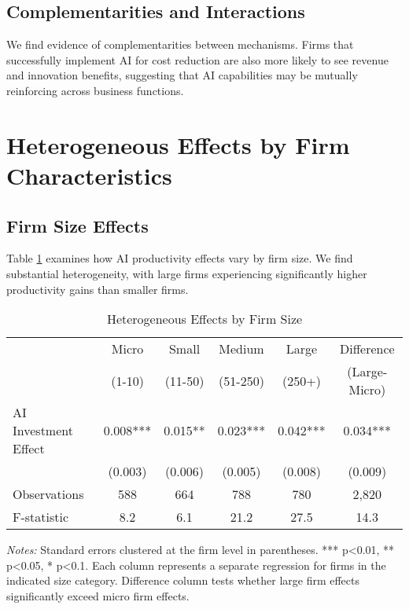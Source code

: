 \documentclass[12pt, a4paper]{article}
\begin{document}
\subsection{Complementarities and Interactions}

We find evidence of complementarities between mechanisms. Firms that successfully implement AI for cost reduction are also more likely to see revenue and innovation benefits, suggesting that AI capabilities may be mutually reinforcing across business functions.

\section{Heterogeneous Effects by Firm Characteristics}

\subsection{Firm Size Effects}

Table \ref{tab:size_heterogeneity} examines how AI productivity effects vary by firm size. We find substantial heterogeneity, with large firms experiencing significantly higher productivity gains than smaller firms.

\begin{table}[H]
\centering
\caption{Heterogeneous Effects by Firm Size}
\label{tab:size_heterogeneity}
\begin{tabular}{lccccc}
\toprule
 & Micro & Small & Medium & Large & Difference \\
 & (1-10) & (11-50) & (51-250) & (250+) & (Large-Micro) \\
\midrule
AI Investment Effect & 0.008*** & 0.015** & 0.023*** & 0.042*** & 0.034*** \\
 & (0.003) & (0.006) & (0.005) & (0.008) & (0.009) \\
\midrule
Observations & 588 & 664 & 788 & 780 & 2,820 \\
F-statistic & 8.2 & 6.1 & 21.2 & 27.5 & 14.3 \\
\bottomrule
\end{tabular}
\begin{minipage}{\textwidth}
\footnotesize
\textit{Notes:} Standard errors clustered at the firm level in parentheses. *** p<0.01, ** p<0.05, * p<0.1. Each column represents a separate regression for firms in the indicated size category. Difference column tests whether large firm effects significantly exceed micro firm effects.
\end{minipage}
\end{table}
\end{document}
